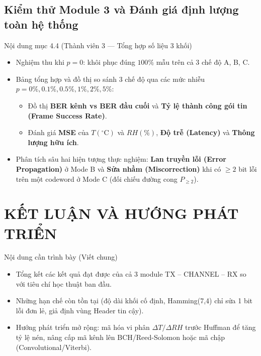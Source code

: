 \documentclass[12pt,a4paper]{report}
\begin{document}
\section{Kiểm thử Module 3 và Đánh giá định lượng toàn hệ thống}
\begin{notebox}{Nội dung mục 4.4 (Thành viên 3 --- Tổng hợp số liệu 3 khối)}
\begin{itemize}[leftmargin=*,nosep]
    \item Nghiệm thu khi $p=0$: khôi phục đúng $100\%$ mẫu trên cả 3 chế độ A, B, C.
    \item Bảng tổng hợp và đồ thị so sánh 3 chế độ qua các mức nhiễu $p = 0\%, 0.1\%, 0.5\%, 1\%, 2\%, 5\%$:
    \begin{itemize}[nosep]
        \item Đồ thị \textbf{BER kênh vs BER đầu cuối} và \textbf{Tỷ lệ thành công gói tin (Frame Success Rate)}.
        \item Đánh giá \textbf{MSE} của $T(^\circ\text{C})$ và $RH(\%)$, \textbf{Độ trễ (Latency)} và \textbf{Thông lượng hữu ích}.
    \end{itemize}
    \item Phân tích sâu hai hiện tượng thực nghiệm: \textbf{Lan truyền lỗi (Error Propagation)} ở Mode B và \textbf{Sửa nhầm (Miscorrection)} khi có $\ge 2$ bit lỗi trên một codeword ở Mode C (đối chiếu đường cong $P_{\ge 2}$).
\end{itemize}
\end{notebox}

\chapter*{KẾT LUẬN VÀ HƯỚNG PHÁT TRIỂN}

\begin{notebox}{Nội dung cần trình bày (Viết chung)}
\begin{itemize}[leftmargin=*,nosep]
    \item Tổng kết các kết quả đạt được của cả 3 module TX -- CHANNEL -- RX so với tiêu chí học thuật ban đầu.
    \item Những hạn chế còn tồn tại (độ dài khối cố định, Hamming(7,4) chỉ sửa 1 bit lỗi đơn lẻ, giả định vùng Header tin cậy).
    \item Hướng phát triển mở rộng: mã hóa vi phân $\Delta T / \Delta RH$ trước Huffman để tăng tỷ lệ nén, nâng cấp mã kênh lên BCH/Reed-Solomon hoặc mã chập (Convolutional/Viterbi).
\end{itemize}
\end{notebox}
\end{document}
